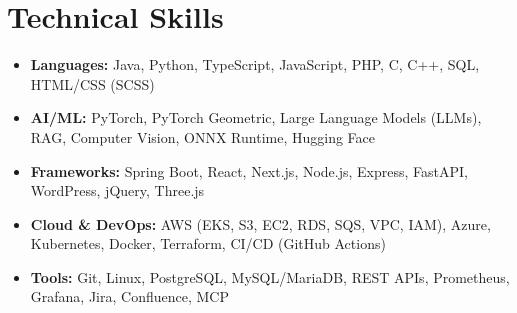 \documentclass[letterpaper,10pt]{article}
\begin{document}
\section{Technical Skills}
\begin{itemize}[leftmargin=0.15in, label={}, itemsep=0pt, topsep=1pt, parsep=0pt]
  \small
  \item \textbf{Languages:} Java, Python, TypeScript, JavaScript, PHP, C, C++, SQL, HTML/CSS (SCSS)
  \item \textbf{AI/ML:} PyTorch, PyTorch Geometric, Large Language Models (LLMs), RAG, Computer Vision, ONNX Runtime, Hugging Face
  \item \textbf{Frameworks:} Spring Boot, React, Next.js, Node.js, Express, FastAPI, WordPress, jQuery, Three.js
  \item \textbf{Cloud \& DevOps:} AWS (EKS, S3, EC2, RDS, SQS, VPC, IAM), Azure, Kubernetes, Docker, Terraform, CI/CD (GitHub Actions)
  \item \textbf{Tools:} Git, Linux, PostgreSQL, MySQL/MariaDB, REST APIs, Prometheus, Grafana, Jira, Confluence, MCP
\end{itemize}
\end{document}
